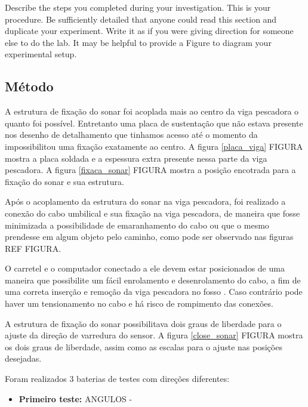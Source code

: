 
Describe the steps you completed during your investigation. This is your procedure. Be sufficiently detailed that anyone could read this section and duplicate your experiment. Write it as if you were giving direction for someone else to do the lab. It may be helpful to provide a Figure to diagram your experimental setup.


\subsection{Método}

A estrutura de fixação do sonar foi acoplada mais ao centro da viga pescadora o
quanto foi possível. Entretanto uma placa de sustentação que não estava presente
nos desenho de detalhamento que tinhamos acesso até o momento da impossibilitou
uma fixação exatamente ao centro. A figura \ref{placa_viga} FIGURA mostra a
placa soldada e a espessura extra presente nessa parte da viga pescadora. A figura
\ref{fixaca_sonar} FIGURA mostra a posição encotrada para a fixação do sonar e
sua estrutura.

Após o acoplamento da estrutura do sonar na viga pescadora, foi realizado a
conexão do cabo umbilical e sua fixação na viga pescadora, de maneira que fosse
minimizada a possibilidade de emaranhamento do cabo ou que o mesmo prendesse em
algum objeto pelo caminho, como pode ser observado nas figuras REF FIGURA.

O carretel e o computador conectado a ele devem estar posicionados de uma
maneira que possibilite um fácil enrolamento e desenrolamento do cabo, a fim de
uma correta inserção e remoção da viga pescadora no fosso %
. Caso contrário pode haver um tensionamento no cabo e há risco de rompimento
das conexões.

A estrutura de fixação do sonar possibilitava dois graus de liberdade para o
ajuste da direção de varredura do sensor. A figura \ref{close_sonar} FIGURA
mostra os dois graus de liberdade, assim como as escalas para o ajuste nas
posições desejadas.

Foram realizados 3 baterias de testes com direções diferentes:  

\begin{itemize}
  \item \textbf{Primeiro teste:} ANGULOS - 
\end{itemize}



 

\label{metodos}


